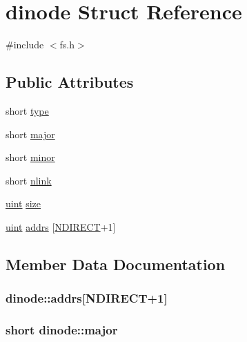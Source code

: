 \hypertarget{structdinode}{}\section{dinode Struct Reference}
\label{structdinode}


{\ttfamily \#include $<$fs.\+h$>$}

\subsection*{Public Attributes}
\begin{DoxyCompactItemize}
\item 
short \hyperlink{structdinode_abf6b2a8476a803284f1c927fb3b82259}{type}
\item 
short \hyperlink{structdinode_aca8272002020f48219df175c986db257}{major}
\item 
short \hyperlink{structdinode_ae97965f85e7353313f85035e8fc63495}{minor}
\item 
short \hyperlink{structdinode_a105562253b461c11413c9a229ef15358}{nlink}
\item 
\hyperlink{types_8h_a91ad9478d81a7aaf2593e8d9c3d06a14}{uint} \hyperlink{structdinode_a990ad8ddf5f8c051fbbe95cf550d2164}{size}
\item 
\hyperlink{types_8h_a91ad9478d81a7aaf2593e8d9c3d06a14}{uint} \hyperlink{structdinode_a705729b3a39c10c0ba6927fc5e4e0563}{addrs} \mbox{[}\hyperlink{fs_8h_acd38e9532d4b3623f844b93c012a8e06}{N\+D\+I\+R\+E\+CT}+1\mbox{]}
\end{DoxyCompactItemize}


\subsection{Member Data Documentation}
\subsubsection[{\texorpdfstring{addrs}{addrs}}]{ dinode\+::addrs\mbox{[}{\bf N\+D\+I\+R\+E\+CT}+1\mbox{]}}\hypertarget{structdinode_a705729b3a39c10c0ba6927fc5e4e0563}{}\label{structdinode_a705729b3a39c10c0ba6927fc5e4e0563}
\subsubsection[{\texorpdfstring{major}{major}}]{\setlength{\rightskip}{0pt plus 5cm}short dinode\+::major}\hypertarget{structdinode_aca8272002020f48219df175c986db257}{}\label{structdinode_aca8272002020f48219df175c986db257}
